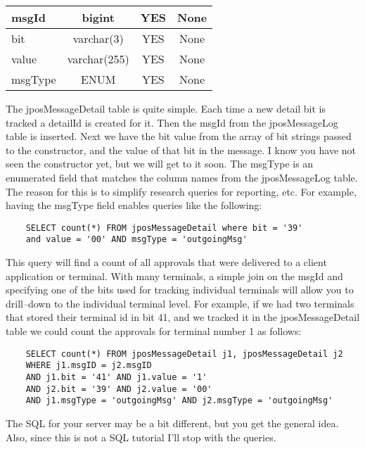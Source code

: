 \documentclass[11pt]{report}
\begin{document}
\begin{flushleft}
\begin{table}
\begin{center}
\begin{tabular}{|l|c|c|c|}
    msgId
    & bigint
    & YES
    & None\\
    \hline

    bit
    & varchar(3)
    & YES
    & None\\
    \hline

    value
    & varchar(255)
    & YES
    & None\\
    \hline

    msgType
    & ENUM
    & YES
    & None\\
    \hline
    \end{tabular}
    \end{center}
    \end{table}

    The jposMessageDetail table is quite simple.  Each time a new detail bit
    is tracked a detailId is created for it.  Then the msgId from the
    jposMessageLog table is inserted.  Next we have the bit value from the
    array of bit strings passed to the constructor, and the value of that bit in the
    message.  I know you have not seen the constructor yet, but we will get to
    it soon.  The msgType is an enumerated field that matches the column names
    from the jposMessageLog table.  The reason for this is to simplify
    research queries for reporting, etc.  For example, having the msgType
    field enables queries like the following:
    \begin{verbatim}
    SELECT count(*) FROM jposMessageDetail where bit = '39' 
    and value = '00' AND msgType = 'outgoingMsg'
    \end{verbatim}
    This query will find a count of all approvals that were delivered to a
    client application or terminal.  With many terminals, a simple join on the
    msgId and specifying one of the bits used for tracking individual
    terminals will allow you to drill--down to the individual terminal level.
    For example, if we had two terminals that stored their terminal id in bit
    41, and we tracked it in the jposMessageDetail table we could count the
    approvals for terminal number 1 as follows:
    \begin{verbatim}
    SELECT count(*) FROM jposMessageDetail j1, jposMessageDetail j2 
    WHERE j1.msgID = j2.msgID 
    AND j1.bit = '41' AND j1.value = '1' 
    AND j2.bit = '39' AND j2.value = '00'
    AND j1.msgType = 'outgoingMsg' AND j2.msgType = 'outgoingMsg'
    \end{verbatim}
    The SQL for your server may be a bit different, but you get the general
    idea.  Also, since this is not a SQL tutorial I'll stop with the queries.



\end{flushleft}
\end{document}
